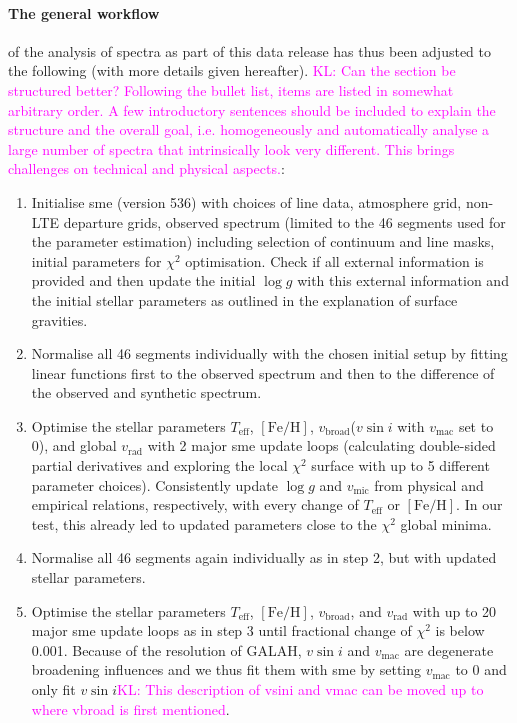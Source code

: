 \documentclass[fleqn,usenatbib,useAMS]{mnras}
\newcommand{\Teff}{$T_\mathrm{eff}$\xspace}
\newcommand{\logg}{$\log g$\xspace}
\newcommand{\feh}{$\mathrm{[Fe/H]}$\xspace}
\newcommand{\vmic}{$v_\mathrm{mic}$\xspace}
\newcommand{\vmac}{$v_\mathrm{mac}$\xspace}
\newcommand{\vsini}{$v \sin i$\xspace}
\newcommand{\vbroad}{$v_\mathrm{broad}$\xspace}
\newcommand{\vrad}{$v_\mathrm{rad}$\xspace}
\newcommand\KL[1]{\textcolor{magenta}{KL: #1}}
\begin{document}
\paragraph*{The general workflow} of the analysis of spectra as part of this data release has thus been adjusted to the following (with more details given hereafter). \KL{Can the section be structured better? Following the bullet list, items are listed in somewhat arbitrary order. A few introductory sentences should be included to explain the structure and the overall goal, i.e. homogeneously and automatically analyse a large number of spectra that intrinsically look very different. This brings challenges on technical and physical aspects.}:
\begin{enumerate}
\item Initialise {\sc sme} (version 536) with choices of line data, atmosphere grid, non-LTE departure grids, observed spectrum (limited to the 46 segments used for the parameter estimation) including selection of continuum and line masks, initial parameters for $\chi^2$ optimisation. Check if all external information is provided and then update the initial \logg with this external information and the initial stellar parameters as outlined in the explanation of surface gravities.
\item Normalise all 46 segments individually with the chosen initial setup by fitting linear functions first to the observed spectrum and then to the difference of the observed and synthetic spectrum.
\item Optimise the stellar parameters \Teff, \feh, \vbroad (\vsini with \vmac set to 0), and global \vrad with 2 major {\sc sme} update loops (calculating double-sided partial derivatives and exploring the local $\chi^2$ surface with up to 5 different parameter choices). Consistently update \logg and \vmic from physical and empirical relations, respectively, with every change of \Teff or \feh. In our test, this already led to updated parameters close to the $\chi^2$ global minima.
\item Normalise all 46 segments again individually as in step 2, but with updated stellar parameters.
\item Optimise the stellar parameters \Teff, \feh, \vbroad, and \vrad with up to 20 major {\sc sme} update loops as in step 3 until fractional change of $\chi^2$ is below 0.001. Because of the resolution of GALAH, \vsini and \vmac are degenerate broadening influences and we thus fit them with {\sc sme} by setting \vmac to 0 and only fit \vsini \KL{This description of vsini and vmac can be moved up to where vbroad is first mentioned}.

\end{enumerate}
\end{document}
